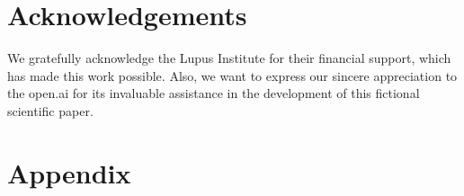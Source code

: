 \documentclass[english]{cenarticle}
\begin{document}
\section*{Acknowledgements}

We gratefully acknowledge the Lupus Institute for their financial support, which has made this work possible. Also, we want to express our sincere appreciation to the open.ai for its invaluable assistance in the development of this fictional scientific paper.



\theauthorcontributions

\howtocite

\section*{Appendix}

\end{document}
